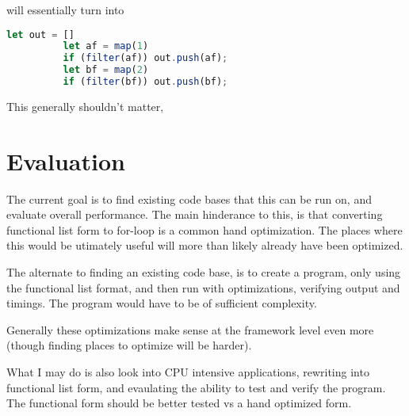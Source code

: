 \documentclass{article}
\begin{document}
\begin{enumerate}
        will essentially turn into 

        \begin{lstlisting}[language=JavaScript]
          let out = []
          let af = map(1)
          if (filter(af)) out.push(af);
          let bf = map(2)
          if (filter(bf)) out.push(bf);
        \end{lstlisting}                

        This generally shouldn't matter,      
    \end{enumerate}

\section{Evaluation}
The current goal is to find existing code bases that this can be run on, and evaluate overall performance.  
The main hinderance to this, is that converting functional list form to for-loop is a common hand
optimization.  The places where this would be utimately useful will more than likely already have been 
optimized.  

The alternate to finding an existing code base, is to create a program, only using the functional list format, 
and then run with optimizations, verifying output and timings. The program would have to be of sufficient
complexity.

Generally these optimizations make sense at the framework level even more (though finding places to optimize will be harder).

What I may do is also look into CPU intensive applications, rewriting into functional list form, and evaulating
the ability to test and verify the program.  The functional form should be better tested vs a hand optimized 
form. 
\end{document}
